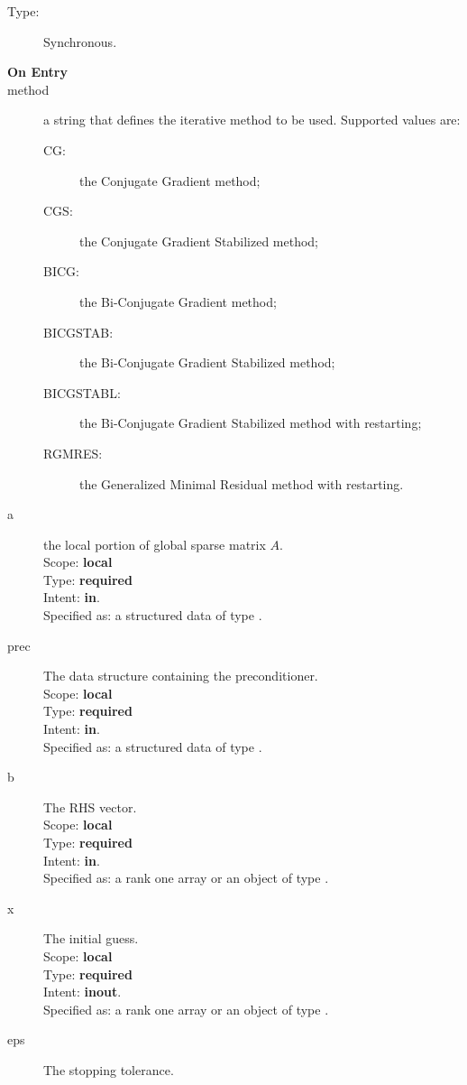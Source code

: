 \begin{description}
\item[Type:] Synchronous.
\item[\bf On Entry]
\item[method] a string that defines the iterative method to be
  used. Supported values are:
  \begin{description}
  \item[CG:] the Conjugate Gradient method;
  \item[CGS:] the Conjugate Gradient Stabilized method;

  \item[BICG:] the Bi-Conjugate Gradient method;
  \item[BICGSTAB:] the Bi-Conjugate Gradient Stabilized method;
  \item[BICGSTABL:] the Bi-Conjugate Gradient Stabilized method with restarting;
  \item[RGMRES:] the Generalized Minimal Residual method with restarting.
  \end{description}
\item[a] the local portion of global sparse matrix
$A$. \\
Scope: {\bf local} \\
Type: {\bf required}\\
Intent: {\bf in}.\\
Specified as: a structured data of type \spdata.
\item[prec] The data structure containing the preconditioner.\\
Scope: {\bf local} \\
Type: {\bf required}\\
Intent: {\bf in}.\\
Specified as: a structured data of type \precdata.
\item[b] The RHS vector. \\
Scope: {\bf local} \\
Type: {\bf required}\\
Intent: {\bf in}.\\
Specified as:  a rank one array or an object of type \vdata.
\item[x] The initial guess. \\
Scope: {\bf local} \\
Type: {\bf required}\\
Intent: {\bf inout}.\\
Specified as:  a rank one array or an object of type \vdata.
\item[eps] The stopping tolerance. \\

\end{description}
